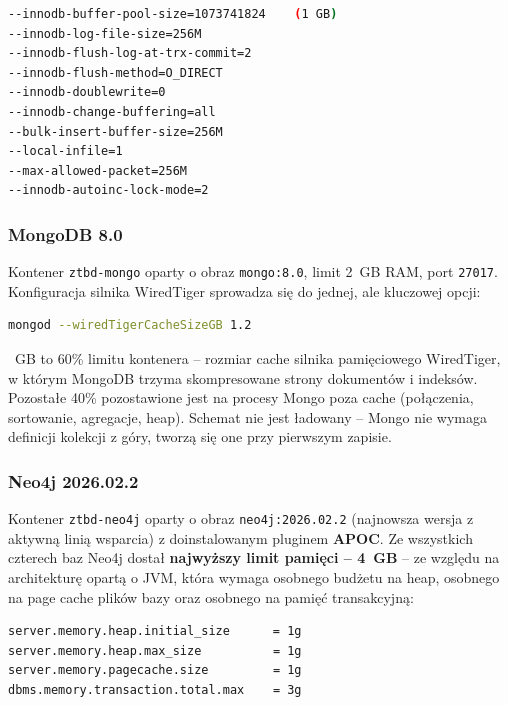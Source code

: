 \begin{lstlisting}[language=bash,basicstyle=\ttfamily\small]
--innodb-buffer-pool-size=1073741824    (1 GB)
--innodb-log-file-size=256M
--innodb-flush-log-at-trx-commit=2
--innodb-flush-method=O_DIRECT
--innodb-doublewrite=0
--innodb-change-buffering=all
--bulk-insert-buffer-size=256M
--local-infile=1
--max-allowed-packet=256M
--innodb-autoinc-lock-mode=2
\end{lstlisting}


\subsubsection*{MongoDB 8.0}

Kontener \texttt{ztbd-mongo} oparty o obraz \texttt{mongo:8.0}, limit 2~GB RAM,
port \texttt{27017}. Konfiguracja silnika WiredTiger sprowadza się do jednej,
ale kluczowej opcji:

\begin{lstlisting}[language=bash,basicstyle=\ttfamily\small]
mongod --wiredTigerCacheSizeGB 1.2
\end{lstlisting}

~GB to 60\% limitu kontenera -- rozmiar cache silnika pamięciowego
WiredTiger, w którym MongoDB trzyma skompresowane strony dokumentów i indeksów.
Pozostałe 40\% pozostawione jest na procesy Mongo poza cache (połączenia, sortowanie,
agregacje, heap). Schemat nie jest ładowany -- Mongo nie wymaga definicji kolekcji
z góry, tworzą się one przy pierwszym zapisie.

\subsubsection*{Neo4j 2026.02.2}

Kontener \texttt{ztbd-neo4j} oparty o obraz \texttt{neo4j:2026.02.2} (najnowsza
wersja z aktywną linią wsparcia) z doinstalowanym pluginem \textbf{APOC}.
Ze wszystkich
czterech baz Neo4j dostał \textbf{najwyższy limit pamięci -- 4~GB} -- ze względu
na architekturę opartą o JVM, która wymaga osobnego budżetu na heap, osobnego
na page cache plików bazy oraz osobnego na pamięć transakcyjną:

\begin{lstlisting}[language=bash,basicstyle=\ttfamily\small]
server.memory.heap.initial_size      = 1g
server.memory.heap.max_size          = 1g
server.memory.pagecache.size         = 1g
dbms.memory.transaction.total.max    = 3g
\end{lstlisting}


